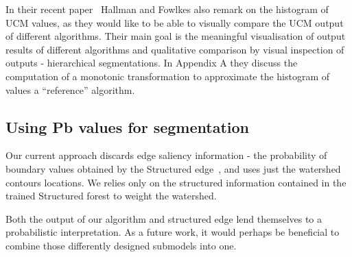 In their recent paper~\cite{Hallman2014} Hallman and Fowlkes also remark on the histogram of UCM values, as they would like to be able to visually compare the UCM output of different algorithms. Their main goal is the meaningful visualisation of output results of different algorithms and qualitative comparison by visual inspection of outputs - hierarchical segmentations. In Appendix A they discuss the computation of a monotonic transformation to approximate the histogram of values \wrt a ``reference'' algorithm.

\subsection*{Using Pb values for segmentation} %
Our current approach discards edge saliency information - the probability of boundary values obtained by the Structured edge~\cite{DollarICCV13edges}, and uses just the watershed contours locations. We relies only on the structured information contained in the trained Structured forest to weight the watershed.

Both the output of our algorithm and structured edge lend themselves to %
a probabilistic interpretation. As a future work, it would perhaps be beneficial to combine those differently designed submodels into one.

